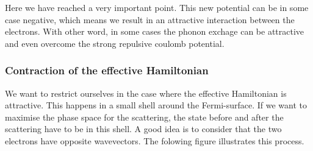 \documentclass[../main.tex]{subfile}
\begin{document}
Here we have reached a very important point. This new potential can be in some case negative, which means we result in an attractive interaction between the electrons. 
With other word, in some cases the phonon exchage can be attractive and even overcome the strong repulsive coulomb potential.

\subsubsection{Contraction of the effective Hamiltonian}
We want to restrict ourselves in the case where the effective Hamiltonian is attractive. This happens in a small shell around the Fermi-surface.
If we want to maximise the phase space for the scattering, the state before and after the scattering have to be in this shell. A good idea is 
to consider that the two electrons have opposite wavevectors. The folowing figure illustrates this process.
\end{document}
